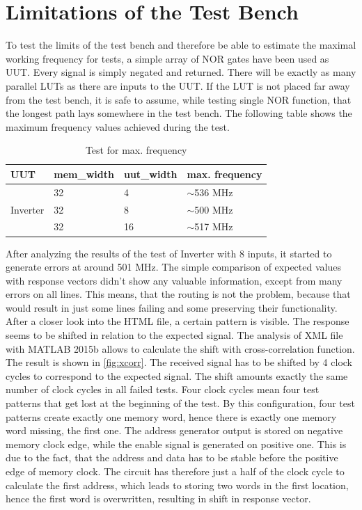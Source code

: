 \section{Limitations of the Test Bench}
To test the limits of the test bench and therefore be able to estimate the maximal working frequency for tests, a simple array of NOR gates have been used as UUT. Every signal is simply negated and returned. There will be exactly as many parallel LUTs as there are inputs to the UUT. If the LUT is not placed far away from the test bench, it is safe to assume, while testing single NOR function, that the longest path lays somewhere in the test bench. The following table shows the maximum frequency values achieved during the test.

\begin{table}[h]
\label{tab:max_freq}
\begin{tabular}{@{}llll@{}}
\toprule
UUT                       &mem\_width   &uut\_width &max. frequency \\ 
\midrule
\multirow{3}{*}{Inverter} &32           &4       & $\sim$536 MHz\\ 
                          & 32          & 8      & $\sim$500 MHz \\  
                          & 32          & 16     & $\sim$517 MHz \\ 
\bottomrule
\end{tabular}
\centering
\caption{Test for max. frequency}
\end{table}

After analyzing the results of the test of Inverter with 8 inputs, it started to generate errors at around 501 MHz. The simple comparison of expected values with response vectors didn't show any valuable information, except from many errors on all lines. This means, that the routing is not the problem, because that would result in just some lines failing and some preserving their functionality. After a closer look into the HTML file, a certain pattern is visible. The response seems to be shifted in relation to the expected signal. The analysis of XML file with MATLAB 2015b allows to calculate the shift with cross-correlation function. The result is shown in \autoref{fig:xcorr}. The received signal has to be shifted by 4 clock cycles to correspond to the expected signal. The shift amounts exactly the same number of clock cycles in all failed tests. Four clock cycles mean four test patterns that get lost at the beginning of the test. By this configuration, four test patterns create exactly one memory word, hence there is exactly one memory word missing, the first one. The address generator output is stored on negative memory clock edge, while the enable signal is generated on positive one. This is due to the fact, that the address and data has to be stable before the positive edge of memory clock. The circuit has therefore just a half of the clock cycle to calculate the first address, which leads to storing two words in the first location, hence the first word is overwritten, resulting in shift in response vector.

